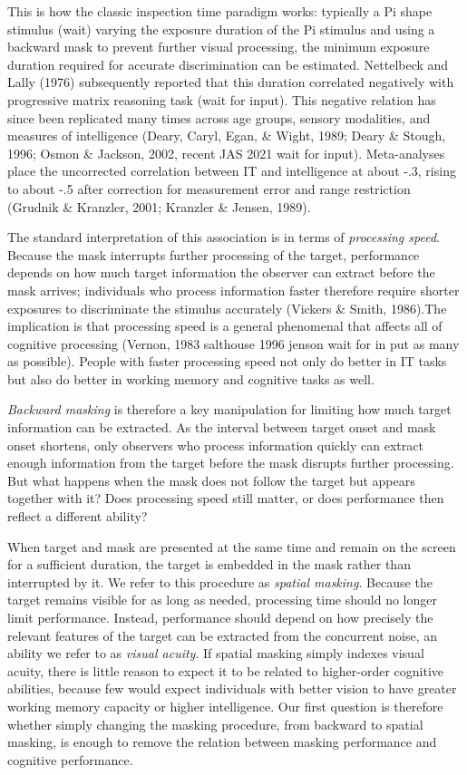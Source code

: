 \documentclass[
  ,man]{apa6}
\begin{document}
This is how the classic inspection time paradigm works: typically a Pi shape stimulus (wait) varying the exposure duration of the Pi stimulus and using a backward mask to prevent further visual processing, the minimum exposure duration required for accurate discrimination can be estimated. Nettelbeck and Lally (1976) subsequently reported that this duration correlated negatively with progressive matrix reasoning task (wait for input). This negative relation has since been replicated many times across age groups, sensory modalities, and measures of intelligence (Deary, Caryl, Egan, \& Wight, 1989; Deary \& Stough, 1996; Osmon \& Jackson, 2002, recent JAS 2021 wait for input). Meta-analyses place the uncorrected correlation between IT and intelligence at about -.3, rising to about -.5 after correction for measurement error and range restriction (Grudnik \& Kranzler, 2001; Kranzler \& Jensen, 1989).

The standard interpretation of this association is in terms of \emph{processing speed}. Because the mask interrupts further processing of the target, performance depends on how much target information the observer can extract before the mask arrives; individuals who process information faster therefore require shorter exposures to discriminate the stimulus accurately (Vickers \& Smith, 1986).The implication is that processing speed is a general phenomenal that affects all of cognitive processing (Vernon, 1983 salthouse 1996 jenson wait for in put as many as possible). People with faster processing speed not only do better in IT tasks but also do better in working memory and cognitive tasks as well.

\emph{Backward masking} is therefore a key manipulation for limiting how much target information can be extracted. As the interval between target onset and mask onset shortens, only observers who process information quickly can extract enough information from the target before the mask disrupts further processing. But what happens when the mask does not follow the target but appears together with it? Does processing speed still matter, or does performance then reflect a different ability?

When target and mask are presented at the same time and remain on the screen for a sufficient duration, the target is embedded in the mask rather than interrupted by it. We refer to this procedure as \emph{spatial masking}. Because the target remains visible for as long as needed, processing time should no longer limit performance. Instead, performance should depend on how precisely the relevant features of the target can be extracted from the concurrent noise, an ability we refer to as \emph{visual acuity}. If spatial masking simply indexes visual acuity, there is little reason to expect it to be related to higher-order cognitive abilities, because few would expect individuals with better vision to have greater working memory capacity or higher intelligence. Our first question is therefore whether simply changing the masking procedure, from backward to spatial masking, is enough to remove the relation between masking performance and cognitive performance.
\end{document}
